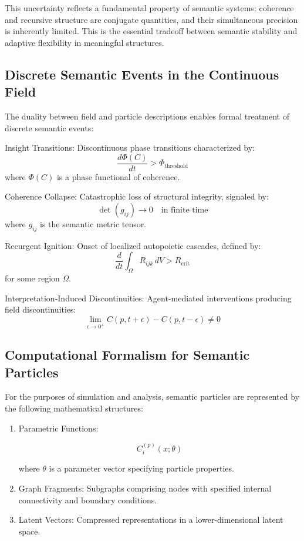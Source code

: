 This uncertainty reflects a fundamental property of semantic systems: coherence and recursive structure are conjugate quantities, and their simultaneous precision is inherently limited. This is the essential tradeoff between semantic stability and adaptive flexibility in meaningful structures.

\subsection{Discrete Semantic Events in the Continuous Field}

The duality between field and particle descriptions enables formal treatment of discrete semantic events:

Insight Transitions: Discontinuous phase transitions characterized by:
\begin{equation}
\frac{d\Phi(C)}{dt} > \Phi_{\mathrm{threshold}}
\end{equation}
where \(\Phi(C)\) is a phase functional of coherence.

Coherence Collapse: Catastrophic loss of structural integrity, signaled by:
\begin{equation}
\det(g_{ij}) \to 0 \quad \text{in finite time}
\end{equation}
where \(g_{ij}\) is the semantic metric tensor.

Recurgent Ignition: Onset of localized autopoietic cascades, defined by:
\begin{equation}
\frac{d}{dt}\int_{\Omega} R_{ijk} \, dV > R_{\mathrm{crit}}
\end{equation}
for some region \(\Omega\).

Interpretation-Induced Discontinuities: Agent-mediated interventions producing field discontinuities:
\begin{equation}
\lim_{\epsilon \to 0^+} C(p, t+\epsilon) - C(p, t-\epsilon) \neq 0
\end{equation}

\subsection{Computational Formalism for Semantic Particles}

For the purposes of simulation and analysis, semantic particles are represented by the following mathematical structures:

\begin{enumerate}
    \item Parametric Functions:

    \begin{equation}
    C_i^{(p)}(x; \theta)
    \end{equation}

    where \(\theta\) is a parameter vector specifying particle properties.

    \item Graph Fragments: Subgraphs comprising nodes with specified internal connectivity and boundary conditions.

    \item Latent Vectors: Compressed representations in a lower-dimensional latent space.
\end{enumerate}

